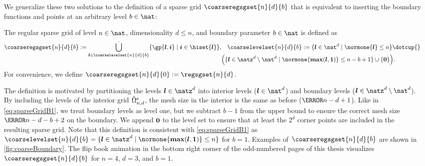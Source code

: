 We generalize these two solutions to the definition of a
sparse grid $\coarseregsgset{n}{d}{b}$ that is equivalent to inserting
the boundary functions and points at an arbitrary level $b \in \nat$:
\begin{definition}
  \label{def:coarseBoundary}
  The regular sparse grid of level $n \in \nat$,
  dimensionality $d \le n$, and boundary parameter $b \in \nat$ is defined as
  \begin{equation}
    \label{eq:coarseBoundary}
    \begin{split}
      \coarseregsgset{n}{d}{b}
      := \bigdotcup_{\*l \in \coarselevelset{n}{d}{b}}
      \{\gp{\*l,\*i} \mid \*i \in \hiset{\*l}\},&\quad
      \coarselevelset{n}{d}{b}
      := \{\*l \in \nat^d \mid \normone{\*l} \le n\} \dotcup {}\\[-1em]
      &\paren*{
        \{\*l \in \natz^d \setminus \nat^d \mid
        \normone{\vecmax(\*l, \*1)} \le n-b+1\} \cup \{\*0\}
      }.
    \end{split}
  \end{equation}
  For convenience, we define
  $\coarseregsgset{n}{d}{0} := \regsgset{n}{d}$.
\end{definition}
The definition is motivated by partitioning the levels $\*l \in \natz^d$
into interior levels ($\*l \in \nat^d$)
and boundary levels ($\*l \in \natz^d \setminus \nat^d$).
By including the levels of the interior grid $\interiorregsgset{n}{d}$,
the mesh size in the interior is the same as before ($\ms{n-d+1}$).
Like in \eqref{eq:sparseGridB1}, we treat boundary levels as level one,
but we subtract $b - 1$ from the upper bound to ensure the correct
mesh size $\ms{n-d-b+2}$ on the boundary.
We append ${\boldsymbol{0}}$ to the level set to ensure that at least the $2^d$ corner
points are included in the resulting sparse grid.
Note that this definition is consistent with \eqref{eq:sparseGridB1} as
$\coarselevelset{n}{d}{b}
= \{\*l \in \natz^d \mid \normone{\vecmax(\*l, \*1)} \le n\}$
for $b = 1$.
Examples of~$\coarseregsgset{n}{d}{b}$ are shown
in \cref{fig:coarseBoundary}.
The flip book animation in the bottom right corner of the
odd-numbered pages of this thesis
visualizes $\coarseregsgset{n}{d}{b}$ for $n = 4$, $d = 3$, and $b = 1$.

